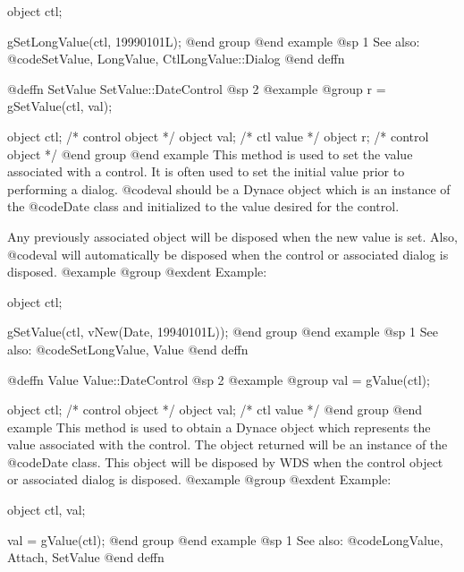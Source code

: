 {object  ctl;

gSetLongValue(ctl, 19990101L);
@end group
@end example
@sp 1
See also:  @code{SetValue, LongValue, CtlLongValue::Dialog}
@end deffn













@deffn {SetValue} SetValue::DateControl
@sp 2
@example
@group
r = gSetValue(ctl, val);

object  ctl;    /*  control object  */
object  val;    /*  ctl value       */
object  r;      /*  control object  */
@end group
@end example
This method is used to set the value associated with a control.  It is
often used to set the initial value prior to performing a dialog.
@code{val} should be a Dynace object which is an instance of the
@code{Date} class and initialized to the value desired for the control.

Any previously associated object will be disposed when the new value is set.
Also, @code{val} will automatically be disposed when the control or associated
dialog is disposed.
@example
@group
@exdent Example:

object  ctl;

gSetValue(ctl, vNew(Date, 19940101L));
@end group
@end example
@sp 1
See also:  @code{SetLongValue, Value}
@end deffn














@deffn {Value} Value::DateControl
@sp 2
@example
@group
val = gValue(ctl);

object  ctl;   /*  control object  */
object  val;   /*  ctl value       */
@end group
@end example
This method is used to obtain a Dynace object which represents the value
associated with the control.  The object returned will be an instance of
the @code{Date} class.  This object will be disposed by WDS when the
control object or associated dialog is disposed.
@example
@group
@exdent Example:

object  ctl, val;

val = gValue(ctl);
@end group
@end example
@sp 1
See also:  @code{LongValue, Attach, SetValue}
@end deffn

















}
